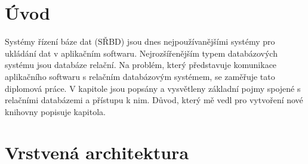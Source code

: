 \documentclass[ing,male,java,dept456]{diploma}						%
\begin{document}
\MakeTitlePages

\tableofcontents
\cleardoublepage	%

\listoftables
\cleardoublepage	%

\listoffigures
\cleardoublepage	%


\lstlistoflistings
\cleardoublepage	%

\section{Úvod}
\label{sec:Intro}
Systémy řízení báze dat (SŘBD) jsou dnes nejpoužívanějšími systémy pro ukládání dat v aplikačním softwaru. Nejrozšířenějším typem databázových systému jsou databáze relační. Na problém, který představuje komunikace aplikačního softwaru s relačním databázovým systémem, se zaměřuje tato diplomová práce.
V kapitole jsou popsány a vysvětleny základní pojmy spojené s relačními databázemi a přístupu k nim.
Důvod, který mě vedl pro vytvoření nové knihovny popisuje kapitola. 

\section{Vrstvená architektura}
\end{document}
